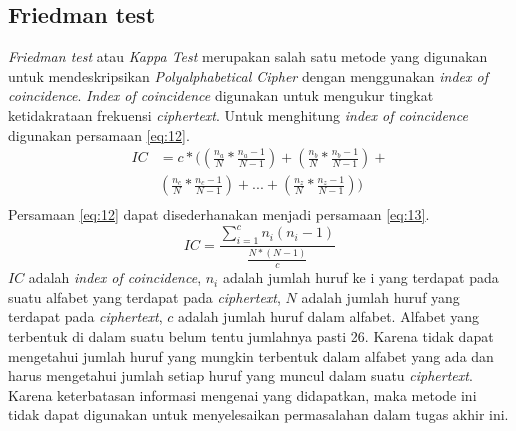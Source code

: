 	\subsection{Friedman test}
	\textit{Friedman test} atau \textit{Kappa Test} merupakan salah satu metode yang digunakan untuk mendeskripsikan \textit{Polyalphabetical Cipher} dengan menggunakan \textit{index of coincidence}. \textit{Index of coincidence} digunakan untuk mengukur tingkat ketidakrataan frekuensi \textit{ciphertext}. Untuk menghitung \textit{index of coincidence} digunakan persamaan \ref{eq:12}\cite{henk_encyclopedia_2005}.
	\begin{equation} \label{eq:12}
	\begin{split}
	IC&=c*((\frac{n_a}{N}*\frac{n_a-1}{N-1})+(\frac{n_b}{N}*\frac{n_b-1}{N-1})+ \\
	&(\frac{n_c}{N}*\frac{n_c-1}{N-1})+...+(\frac{n_z}{N}*\frac{n_z-1}{N-1}))\\
	\end{split}
	\end{equation}
	Persamaan \ref{eq:12} dapat disederhanakan menjadi persamaan \ref{eq:13}.
	\begin{equation} \label{eq:13}
	IC=\frac{\sum_{i=1}^{c}n_i(n_i-1)}{\frac{N*(N-1)}{c}}
	\end{equation}
	$IC$ adalah \textit{index of coincidence}, $n_i$ adalah jumlah huruf ke i yang terdapat pada suatu alfabet yang terdapat pada \textit{ciphertext}, $N$ adalah jumlah huruf yang terdapat pada \textit{ciphertext}, $c$ adalah jumlah huruf dalam alfabet. Alfabet yang terbentuk di dalam suatu \ciphertext belum tentu jumlahnya pasti 26. Karena tidak dapat mengetahui jumlah huruf yang mungkin terbentuk dalam alfabet yang ada dan harus mengetahui jumlah setiap huruf yang muncul dalam suatu \textit{ciphertext}. Karena keterbatasan informasi mengenai \ciphertext yang didapatkan, maka metode ini tidak dapat digunakan untuk menyelesaikan permasalahan dalam tugas akhir ini.
	
